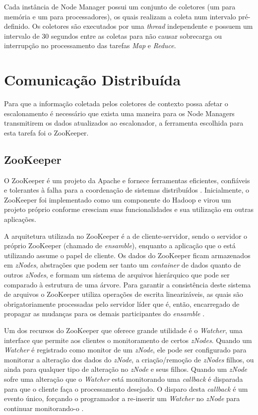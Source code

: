 Cada instância de Node Manager possui um conjunto de coletores (um para memória e um para processadores), os quais realizam a coleta num intervalo pré-definido. Os coletores são executados por uma \textit{thread} independente e possuem um intervalo de 30 segundos entre as coletas para não causar sobrecarga ou interrupção no  processamento das tarefas \textit{Map} e \textit{Reduce}.

\section{Comunicação Distribuída}
\label{sec:zookeeper}

Para que a informação coletada pelos coletores de contexto possa afetar o escalonamento é necessário que exista uma maneira para os Node Managers transmitirem os dados atualizados ao escalonador, a ferramenta escolhida para esta tarefa foi o ZooKeeper.

\subsection{ZooKeeper}
O ZooKeeper é um projeto da Apache e fornece ferramentas eficientes, confiáveis e tolerantes à falha para a coordenação de sistemas distribuídos \cite{Hunt2010}. Inicialmente, o ZooKeeper foi implementado como um componente do Hadoop e virou um projeto próprio conforme cresciam suas funcionalidades e sua utilização em outras aplicações. 

A arquitetura utilizada no ZooKeeper é a de cliente-servidor, sendo o servidor o próprio ZooKeeper (chamado de \textit{ensamble}), enquanto a aplicação que o está utilizando assume o papel de cliente. Os dados do ZooKeeper ficam armazenados em \textit{zNodes}, abstrações que podem ser tanto um \textit{container} de dados quanto de outros \textit{zNodes}, e formam um sistema de arquivos hierárquico que pode ser comparado à estrutura de uma árvore. Para garantir a consistência deste sistema de arquivos o ZooKeeper utiliza operações de escrita linearizáveis, as quais são obrigatoriamente processadas pelo servidor líder que é, então, encarregado de propagar as mudanças para os demais participantes do \textit{ensamble} \cite{Pham}.

Um dos recursos do ZooKeeper que oferece grande utilidade é o \textit{Watcher}, uma interface que permite aos clientes o monitoramento de certos \textit{zNodes}. Quando um \textit{Watcher} é registrado como monitor de um \textit{zNode}, ele pode ser configurado para monitorar a alteração dos dados do \textit{zNode}, a criação/remoção de \textit{zNodes} filhos, ou ainda para qualquer tipo de alteração no \textit{zNode} e seus filhos. Quando um \textit{zNode} sofre uma alteração que o \textit{Watcher} está monitorando uma \textit{callback} é disparada para que o cliente faça o processamento desejado. O disparo desta \textit{callback} é um evento único, forçando o programador a re-inserir um \textit{Watcher} no \textit{zNode} para continuar monitorando-o \cite{HadoopBook}.

